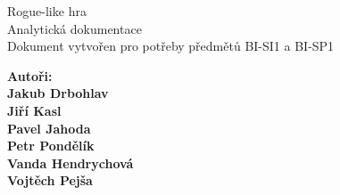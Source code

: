 \documentclass[12pt,a4paper]{article}
\begin{document}


\renewcommand{\headrulewidth}{0pt}
\renewcommand{\footrulewidth}{0pt}

\begin{titlepage}
  \thispagestyle{fancy}
  
	\vspace*{\fill}
	\begin{center}
    {\fontsize{28.83}{100}\selectfont Rogue-like hra}\\[0.6cm] %
		{\fontsize{15.74}{40}\selectfont Analytická dokumentace}\\[1.5cm]
    {\fontsize{10}{10} \selectfont Dokument vytvořen pro potřeby předmětů
    BI-SI1 a BI-SP1}\\
	\end{center}
  
	\vspace*{\fill}
  
  {\fontsize{10}{10} \selectfont \noindent
  \bf Autoři:\rm\\
  Jakub Drbohlav\\
  Jiří Kasl\\
  Pavel Jahoda\\
  Petr Pondělík\\
  Vanda Hendrychová\\
  Vojtěch Pejša\\
  }
\end{titlepage}

\newpage

\renewcommand{\headrulewidth}{0.4pt}
\renewcommand{\footrulewidth}{0.4pt}






\tableofcontents

\newpage

\listoffigures

\newpage

\end{document}

